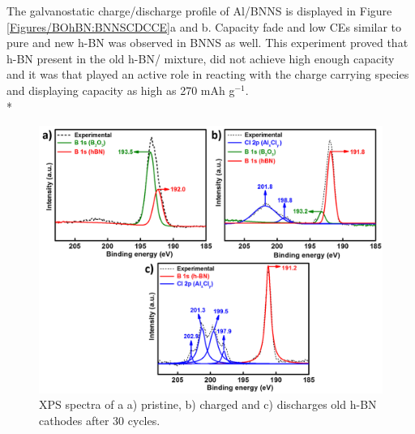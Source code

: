 The galvanostatic charge/discharge profile of Al/BNNS is displayed in Figure \ref{Figures/BOhBN:BNNSCDCCE}a and b. Capacity fade and low CEs similar to pure and new h-BN was observed in BNNS as well. This experiment proved that h-BN present in the old h-BN/  mixture, did not achieve high enough capacity and it was  that played an active role in reacting with the charge carrying species and displaying capacity as high as 270 mAh g$^{-1}$. \\*

\begin{figure}[tbh!]
\centering
\includegraphics[width=\textwidth]{Figures/BOhBN/oldhBNXPS}
\caption{XPS spectra of a a) pristine, b) charged and c) discharges old h-BN cathodes after 30 cycles.}
\label{Figures/BOhBN:oldhBNXPS}
\end{figure}

